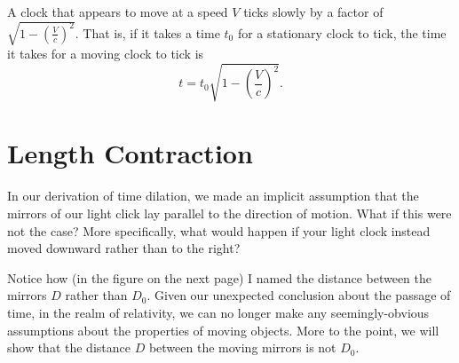 \documentclass[10pt,a4paper,oneside]{book}
\begin{document}
\begin{summary}
    A clock that appears to move at a speed $V$ ticks slowly by a factor of $\sqrt{1 - \left( \frac{V}{c} \right)^2}$.
    That is, if it takes a time $t_0$ for a stationary clock to tick, the time it takes for a moving clock to tick is
    \[ t = t_0 \sqrt{1 - \left( \frac{V}{c} \right)^2}. \]
\end{summary}

\section{Length Contraction}
In our derivation of time dilation, we made an implicit assumption that the mirrors of our light click lay parallel to the direction of motion.
What if this were not the case?
More specifically, what would happen if your light clock instead moved downward rather than to the right?

Notice how (in the figure on the next page) I named the distance between the mirrors $D$ rather than $D_0$.
Given our unexpected conclusion about the passage of time, in the realm of relativity, we can no longer make any seemingly-obvious assumptions about the properties of moving objects.
More to the point, we will show that the distance $D$ between the moving mirrors is not $D_0$.
\end{document}
